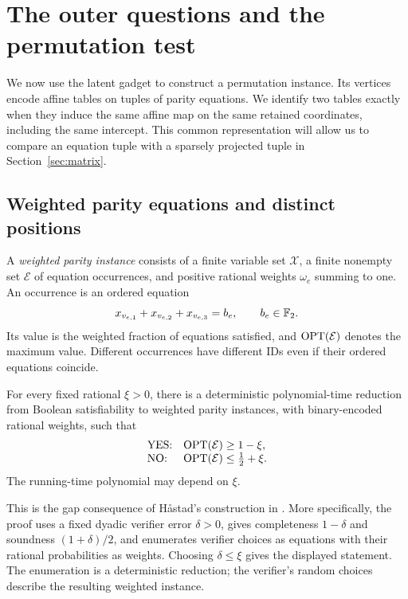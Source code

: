 \section{The outer questions and the permutation test}
\label{sec:game}

We now use the latent gadget to construct a permutation instance.  Its
vertices encode affine tables on tuples of parity equations.  We identify
two tables exactly when they induce the same affine map on the same retained
coordinates, including the same intercept.  This common representation will
allow us to compare an equation tuple with a sparsely projected tuple in
Section~\ref{sec:matrix}.

\subsection{Weighted parity equations and distinct positions}

A \emph{weighted parity instance} consists of a finite variable set
\(\mathcal X\), a finite nonempty set \(\mathcal E\) of equation
occurrences, and positive rational weights \(\omega_e\) summing to one.
An occurrence is an ordered equation
\[
 x_{v_{e,1}}+x_{v_{e,2}}+x_{v_{e,3}}=b_e,
 \qquad b_e\in\mathbb F_2.
\]
Its value is the weighted fraction of equations satisfied, and
\(\operatorname{OPT}(\mathcal E)\) denotes the maximum value.  Different occurrences
have different IDs even if their ordered equations coincide.

\begin{theorem}
\label{thm:parity}
For every fixed rational \(\xi>0\), there is a deterministic
polynomial-time reduction from Boolean satisfiability to weighted parity
instances, with binary-encoded rational weights, such that
\[
 \begin{array}{ll}
 \textup{YES:}&\operatorname{OPT}(\mathcal E)\ge 1-\xi,\\
 \textup{NO:}&\operatorname{OPT}(\mathcal E)\le \frac12+\xi.
 \end{array}
\]
The running-time polynomial may depend on \(\xi\).
\end{theorem}

This is the gap consequence of H\aa stad's construction in
\cite[Theorem~5.4 and its proof]{Hastad01}.  More specifically, the proof
uses a fixed dyadic verifier error \(\delta>0\), gives completeness
\(1-\delta\) and soundness \((1+\delta)/2\), and enumerates verifier
choices as equations with their rational probabilities as weights.
Choosing \(\delta\le\xi\) gives the displayed statement.  The
enumeration is a deterministic reduction; the verifier's random choices
describe the resulting weighted instance.


